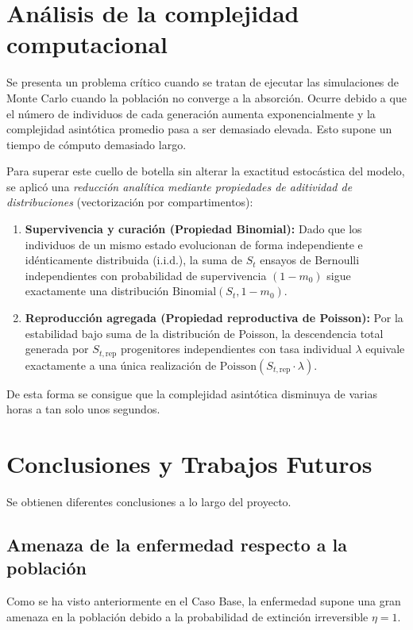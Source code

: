 \documentclass[graybox]{SNmult}
\begin{document}
	\section{Análisis de la complejidad computacional}
	\label{sec:complejidad}
	Se presenta un problema crítico cuando se tratan de ejecutar las simulaciones de Monte Carlo cuando la población no converge a la absorción. Ocurre debido a que el número de individuos de cada generación aumenta exponencialmente y la complejidad asintótica promedio pasa a ser demasiado elevada. Esto supone un tiempo de cómputo demasiado largo. 
	
	Para superar este cuello de botella sin alterar la exactitud estocástica del modelo, se aplicó una \textit{reducción analítica mediante propiedades de aditividad de distribuciones} (vectorización por compartimentos):
	\begin{enumerate}
		\item \textbf{Supervivencia y curación (Propiedad Binomial):} Dado que los individuos de un mismo estado evolucionan de forma independiente e idénticamente distribuida (i.i.d.), la suma de $S_t$ ensayos de Bernoulli independientes con probabilidad de supervivencia $(1 - m_0)$ sigue exactamente una distribución $\text{Binomial}(S_t, 1 - m_0)$.
		\item \textbf{Reproducción agregada (Propiedad reproductiva de Poisson):} Por la estabilidad bajo suma de la distribución de Poisson, la descendencia total generada por $S_{t,\text{rep}}$ progenitores independientes con tasa individual $\lambda$ equivale exactamente a una única realización de $\text{Poisson}(S_{t,\text{rep}} \cdot \lambda)$.
	\end{enumerate}
	
	De esta forma se consigue que la complejidad asintótica disminuya de varias horas a tan solo unos segundos. 
	
	\section{Conclusiones y Trabajos Futuros}
	\label{sec:conclusiones}
	Se obtienen diferentes conclusiones a lo largo del proyecto. 
	
	\subsection{Amenaza de la enfermedad respecto a la población}
	Como se ha visto anteriormente en el Caso Base, la enfermedad supone una gran amenaza en la población debido a la probabilidad de extinción irreversible $\eta = 1$. 
	
\end{document}
